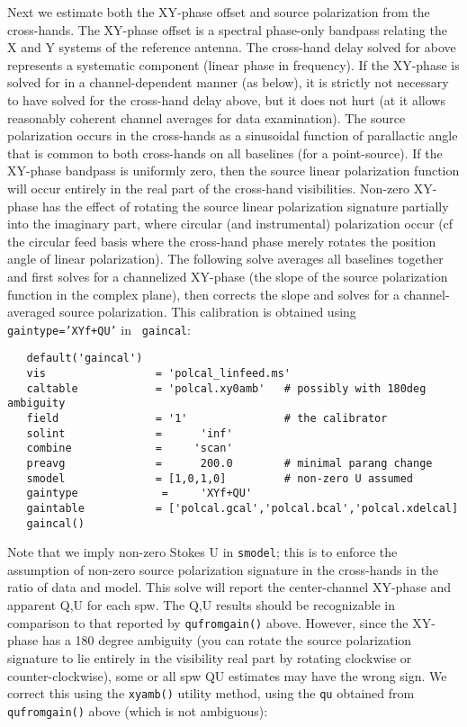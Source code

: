 Next we estimate both the XY-phase offset and source polarization from
the cross-hands.  The XY-phase offset is a spectral phase-only
bandpass relating the X and Y systems of the reference antenna.  The
cross-hand delay solved for above represents a systematic component
(linear phase in frequency).  If the XY-phase is solved for in a
channel-dependent manner (as below), it is strictly not necessary to
have solved for the cross-hand delay above, but it does not hurt (at
it allows reasonably coherent channel averages for data examination).
The source polarization occurs in the cross-hands as a sinusoidal
function of parallactic angle that is common to both cross-hands on
all baselines (for a point-source).  If the XY-phase bandpass is
uniformly zero, then the source linear polarization function will
occur entirely in the real part of the cross-hand visibilities.
Non-zero XY-phase has the effect of rotating the source linear
polarization signature partially into the imaginary part, where
circular (and instrumental) polarization occur (cf the circular feed
basis where the cross-hand phase merely rotates the position angle of
linear polarization).  The following solve averages all baselines
together and first solves for a channelized XY-phase (the slope of the
source polarization function in the complex plane), then corrects the
slope and solves for a channel-averaged source polarization.  This
calibration is obtained using {\tt gaintype='XYf+QU'} in {\tt
gaincal}:

\small
\begin{verbatim}
   default('gaincal')
   vis                 = 'polcal_linfeed.ms'
   caltable            = 'polcal.xy0amb'   # possibly with 180deg ambiguity
   field               = '1'               # the calibrator 
   solint              =      'inf'    
   combine             =     'scan' 
   preavg              =      200.0        # minimal parang change
   smodel              = [1,0,1,0]         # non-zero U assumed
   gaintype             =     'XYf+QU'        
   gaintable           = ['polcal.gcal','polcal.bcal','polcal.xdelcal]
   gaincal()
\end{verbatim}
\normalsize 

Note that we imply non-zero Stokes U in {\tt smodel}; this is to
enforce the assumption of non-zero source polarization signature 
in the cross-hands in the ratio of data and model.  This solve
will report the center-channel XY-phase and apparent Q,U for
each spw.  The Q,U results should be recognizable in comparison
to that reported by {\tt qufromgain()} above.  However, since the 
XY-phase has a 180 degree ambiguity (you can rotate the source
polarization signature to lie entirely in the visibility
real part by rotating clockwise or counter-clockwise), some
or all spw QU estimates may have the wrong sign.  We correct
this using the {\tt xyamb()} utility method, using the {\tt qu}
obtained from {\tt qufromgain()} above (which is not
ambiguous):


